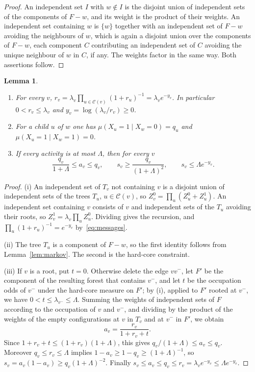 \documentclass{amsart}
\numberwithin{equation}{section}
\numberwithin{table}{section}
\newtheorem{lemma}[theorem]{Lemma}
\theoremstyle{definition}
\theoremstyle{remark}
\newcommand{\Ch}{\mathcal{C}}
\begin{document}
\begin{proof}
An independent set $I$ with $w\notin I$ is the disjoint union of independent sets of the components of $F-w$, and its weight is the product of their weights. An independent set containing $w$ is $\{w\}$ together with an independent set of $F-w$ avoiding the neighbours of $w$, which is again a disjoint union over the components of $F-w$, each component $C$ contributing an independent set of $C$ avoiding the unique neighbour of $w$ in $C$, if any. The weights factor in the same way. Both assertions follow.
\end{proof}

\begin{lemma}\label{lem:marginals}
\begin{enumerate}
\item[(i)] For every $v$, $r_v=\lambda_v\prod_{u\in\Ch(v)}(1+r_u)^{-1}=\lambda_ve^{-y_v}$. In particular $0<r_v\le\lambda_v$ and $y_v=\log(\lambda_v/r_v)\ge0$.
\item[(ii)] For a child $u$ of $w$ one has $\mu(X_u=1\mid X_w=0)=q_u$ and $\mu(X_u=1\mid X_w=1)=0$.
\item[(iii)] If every activity is at most $\Lambda$, then for every $v$
\[
\frac{q_v}{1+\Lambda}\le a_v\le q_v,\qquad s_v\ge\frac{q_v}{(1+\Lambda)^2},\qquad s_v\le\Lambda e^{-y_v}.
\]
\end{enumerate}
\end{lemma}

\begin{proof}
(i) An independent set of $T_v$ not containing $v$ is a disjoint union of independent sets of the trees $T_u$, $u\in\Ch(v)$, so $Z^0_v=\prod_u(Z^0_u+Z^1_u)$. An independent set containing $v$ consists of $v$ and independent sets of the $T_u$ avoiding their roots, so $Z^1_v=\lambda_v\prod_uZ^0_u$. Dividing gives the recursion, and $\prod_u(1+r_u)^{-1}=e^{-y_v}$ by~\eqref{eq:messages}.

(ii) The tree $T_u$ is a component of $F-w$, so the first identity follows from Lemma~\ref{lem:markov}. The second is the hard-core constraint.

(iii) If $v$ is a root, put $t=0$. Otherwise delete the edge $vv^-$, let $F'$ be the component of the resulting forest that contains $v^-$, and let $t$ be the occupation odds of $v^-$ under the hard-core measure on $F'$; by (i), applied to $F'$ rooted at $v^-$, we have $0<t\le\lambda_{v^-}\le\Lambda$. Summing the weights of independent sets of $F$ according to the occupation of $v$ and $v^-$, and dividing by the product of the weights of the empty configurations at $v$ in $T_v$ and at $v^-$ in $F'$, we obtain
\[
a_v=\frac{r_v}{1+r_v+t}.
\]
Since $1+r_v+t\le(1+r_v)(1+\Lambda)$, this gives $q_v/(1+\Lambda)\le a_v\le q_v$. Moreover $q_v\le r_v\le\Lambda$ implies $1-a_v\ge1-q_v\ge(1+\Lambda)^{-1}$, so $s_v=a_v(1-a_v)\ge q_v(1+\Lambda)^{-2}$. Finally $s_v\le a_v\le q_v\le r_v=\lambda_ve^{-y_v}\le\Lambda e^{-y_v}$.
\end{proof}
\end{document}
